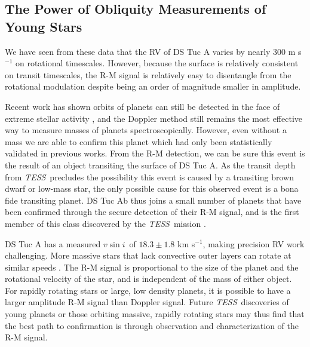 \documentclass[twocolumn]{aastex63}
\newcommand{\tess}{{\it TESS}}
\newcommand{\vsini}{{$v \sin i$}}
\begin{document}
\subsection{The Power of Obliquity Measurements of Young Stars}

We have seen from these data that the RV of DS Tuc A varies by nearly 300 m s$^{-1}$ on rotational timescales. 
However, because the surface is relatively consistent on transit timescales, the R-M signal is relatively easy to disentangle from the rotational modulation despite being an order of magnitude smaller in amplitude.

Recent work has shown orbits of planets can still be detected in the face of extreme stellar activity \citep{Barragan19}, and the Doppler method still remains the most effective way to measure masses of planets spectroscopically. 
However, even without a mass we are able to confirm this planet which had only been statistically validated in previous works. 
From the R-M detection, we can be sure this event is the result of an object transiting the surface of DS Tuc A. 
As the transit depth from \tess\ precludes the possibility this event is caused by a transiting brown dwarf or low-mass star, the only possible cause for this observed event is a bona fide transiting planet.
DS Tuc Ab thus joins a small number of planets that have been confirmed through the secure detection of their R-M signal, and is the first member of this class discovered by the \tess\ mission \citep{Jenkins10b, Hirano12b}. 

DS Tuc A has a measured \vsini~of $18.3 \pm 1.8$ km s$^{-1}$, making precision RV work challenging.
More massive stars that lack convective outer layers can rotate at similar speeds \citep[e.g.][]{McQuillan14}. 
The R-M signal is proportional to the size of the planet and the rotational velocity of the star, and is independent of the mass of either object. 
For rapidly rotating stars or large, low density planets, it is possible to have a larger amplitude R-M signal than Doppler signal. 
Future \tess\ discoveries of young planets or those orbiting massive, rapidly rotating stars may thus find that the best path to confirmation is through observation and characterization of the R-M signal.
\end{document}
